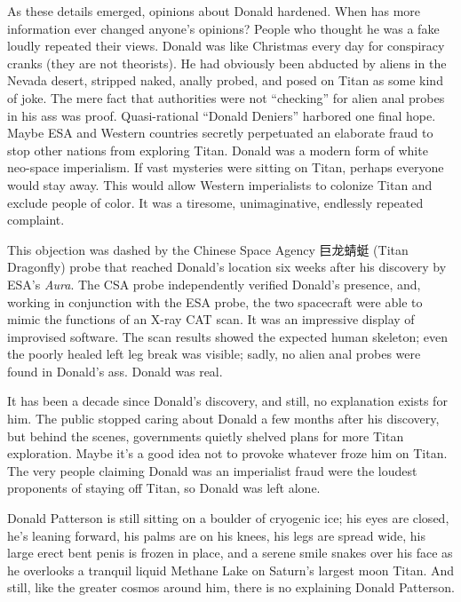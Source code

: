 As these details emerged, opinions about Donald hardened. When has more
information ever changed anyone's opinions? People who thought he was a
fake loudly repeated their views. Donald was like Christmas every day
for conspiracy cranks (they are not theorists). He had obviously been
abducted by aliens in the Nevada desert, stripped naked, anally probed,
and posed on Titan as some kind of joke. The mere fact that authorities
were not ``checking'' for alien anal probes in his ass was proof.
Quasi-rational ``Donald Deniers'' harbored one final hope. Maybe ESA and
Western countries secretly perpetuated an elaborate fraud to stop other
nations from exploring Titan. Donald was a modern form of white
neo-space imperialism. If vast mysteries were sitting on Titan, perhaps
everyone would stay away. This would allow Western imperialists to
colonize Titan and exclude people of color. It was a tiresome,
unimaginative, endlessly repeated complaint.

This objection was dashed by the Chinese Space Agency {\myAsian 巨龙蜻蜓} (Titan
Dragonfly) probe that reached Donald's location six weeks after his
discovery by ESA's \emph{Aura}. The CSA probe independently verified
Donald's presence, and, working in conjunction with the ESA probe, the
two spacecraft were able to mimic the functions of an X-ray CAT scan. It
was an impressive display of improvised software. The scan results
showed the expected human skeleton; even the poorly healed left leg
break was visible; sadly, no alien anal probes were found in Donald's
ass. Donald was real.

It has been a decade since Donald's discovery, and still, no explanation
exists for him. The public stopped caring about Donald a few months
after his discovery, but behind the scenes, governments quietly shelved
plans for more Titan exploration. Maybe it's a good idea not to provoke
whatever froze him on Titan. The very people claiming Donald was an
imperialist fraud were the loudest proponents of staying off Titan, so
Donald was left alone.

Donald Patterson is still sitting on a boulder of cryogenic ice; his
eyes are closed, he's leaning forward, his palms are on his knees, his
legs are spread wide, his large erect bent penis is frozen in place, and
a serene smile snakes over his face as he overlooks a tranquil liquid
Methane Lake on Saturn's largest moon Titan. And still, like the greater
cosmos around him, there is no explaining Donald Patterson.


%
 
